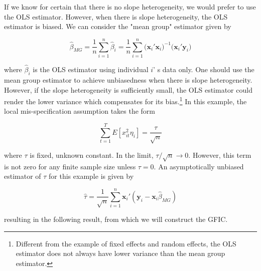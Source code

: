 If we know for certain that there is no slope heterogeneity, we would prefer to use the OLS estimator. However, when there is slope heterogeneity, the OLS estimator is biased. We can consider the "mean group" estimator given by 


	\begin{equation}
\widehat{\beta}_{MG}  = \frac{1}{n}\sum_{i=1}^n \widehat{\beta}_i 
= \frac{1}{n} \sum_{i=1}^n \bigg( \mathbf{x}_i'  \mathbf{x}_i\bigg)^{-1}\bigg( \mathbf{x}_i'  \mathbf{y}_i   \bigg)
\end{equation}

where $\widehat{\beta}_i$ is the OLS estimator using individual $i$'
s data only. One should use the mean group estimator to achieve unbiasedness when there is slope heterogeneity. However, if the slope heterogeneity is sufficiently small, the OLS estimator could render the lower variance which compensates for its bias.\footnote{Different from the example of fixed effects and random effects, the OLS estimator does not always have lower variance than the mean group estimator.} In this example, the local mis-specification assumption takes the form  

\begin{equation}
\sum_{t=1}^T E[x_{it}^2 \eta_i] = \frac{\tau}{\sqrt{n}}
\end{equation}

where $\tau$ is fixed, unknown constant. In the limit, $\tau/\sqrt{n} \rightarrow 0$. However, this term is not zero for any finite sample size unless $\tau =0$. An asymptotically unbiased estimator of $\tau$ for this example is given by

\begin{equation}
\widehat{\tau} = \frac{1}{\sqrt{n}} \sum_{i=1}^n \mathbf{x}_i' (\mathbf{y}_i - \mathbf{x}_i \widehat{\beta}_{MG})
\end{equation}

resulting in the following result, from which we will construct the GFIC. 

